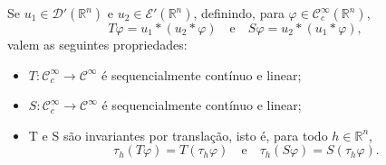 \documentclass[../distribution_theory_notes.tex]{subfiles}
\begin{document}
\begin{lemma*}
	Se \(u_{1}\in \mathcal{D}'(\mathbb{R}^{n})\) e \(u_{2}\in \mathcal{E}'(\mathbb{R}^{n})\), definindo, para \(\varphi\in \mathcal{C}_{c}^{\infty}(\mathbb{R}^{n})\),
	\[
		T\varphi=u_{1}*(u_{2}*\varphi)
		\quad\text{e}\quad
		S\varphi=u_{2}*(u_{1}*\varphi),
	\]
	valem as seguintes propriedades:
	\begin{itemize}
		\item[(i)] \(T:\mathcal{C}_{c}^{\infty}\to \mathcal{C}^{\infty}\) é sequencialmente contínuo e linear;
		\item[(ii)] \(S:\mathcal{C}_{c}^{\infty}\to \mathcal{C}^{\infty}\) é sequencialmente contínuo e linear;
		\item[(iii)] T e S são invariantes por translação, isto é, para todo \(h\in \mathbb{R}^{n}\),
		      \[
			      \tau_{h}(T\varphi)=T(\tau_{h}\varphi)
			      \quad\text{e}\quad
			      \tau_{h}(S\varphi)=S(\tau_{h}\varphi).
		      \]
	\end{itemize}
\end{lemma*}
\end{document}
